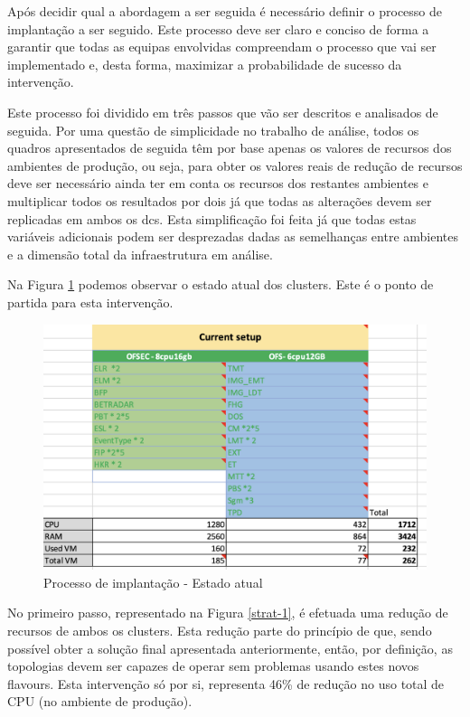 Após decidir qual a abordagem a ser seguida é necessário definir o processo de implantação a ser
seguido. Este processo deve ser claro e conciso de forma a garantir que todas as equipas envolvidas
compreendam o processo que vai ser implementado e, desta forma, maximizar a probabilidade de
sucesso da intervenção. 

Este processo foi dividido em três passos que vão ser descritos e analisados de seguida. Por uma
questão de simplicidade no trabalho de análise, todos os quadros apresentados de seguida têm por 
base apenas os valores de recursos dos ambientes de produção, ou seja, para obter os valores reais
de redução de recursos deve ser necessário ainda ter em conta os recursos dos restantes ambientes
e multiplicar todos os resultados por dois já que todas as alterações devem ser replicadas em 
ambos os \glspl{dc}. Esta simplificação foi feita já que todas estas variáveis adicionais podem 
ser desprezadas dadas as semelhanças entre ambientes e a dimensão total da infraestrutura em
análise.

Na Figura \ref{strat-current} podemos observar o estado atual dos \glspl{cluster}. Este é o ponto
de partida para esta intervenção. 

\begin{figure}[H]
  \centerline{\includegraphics[scale=0.5]{media/content/analise/strat-current.png}}
  \caption{Processo de implantação - Estado atual}
  \label{strat-current}
\end{figure}

No primeiro passo, representado na Figura \ref{strat-1}, é efetuada uma redução de recursos 
de ambos os \glspl{cluster}. Esta redução parte do princípio de que, sendo possível obter a 
solução final apresentada anteriormente, então, por definição, as topologias devem ser capazes de
operar sem problemas usando estes novos \glspl{flavour}. Esta intervenção só por si, representa
46\% de redução no uso total de \ac{CPU} (no ambiente de produção).

